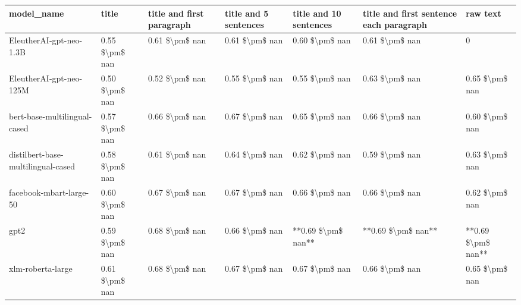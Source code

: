 \begin{tabular}{lllllll}
\toprule
                        model\_name &          title & title and first paragraph & title and 5 sentences & title and 10 sentences & title and first sentence each paragraph &           raw text \\
\midrule
           EleutherAI-gpt-neo-1.3B & 0.55 \$\textbackslash pm\$ nan &            0.61 \$\textbackslash pm\$ nan &        0.61 \$\textbackslash pm\$ nan &         0.60 \$\textbackslash pm\$ nan &                          0.61 \$\textbackslash pm\$ nan &                  0 \\
           EleutherAI-gpt-neo-125M & 0.50 \$\textbackslash pm\$ nan &            0.52 \$\textbackslash pm\$ nan &        0.55 \$\textbackslash pm\$ nan &         0.55 \$\textbackslash pm\$ nan &                          0.63 \$\textbackslash pm\$ nan &     0.65 \$\textbackslash pm\$ nan \\
      bert-base-multilingual-cased & 0.57 \$\textbackslash pm\$ nan &            0.66 \$\textbackslash pm\$ nan &        0.67 \$\textbackslash pm\$ nan &         0.65 \$\textbackslash pm\$ nan &                          0.66 \$\textbackslash pm\$ nan &     0.60 \$\textbackslash pm\$ nan \\
distilbert-base-multilingual-cased & 0.58 \$\textbackslash pm\$ nan &            0.61 \$\textbackslash pm\$ nan &        0.64 \$\textbackslash pm\$ nan &         0.62 \$\textbackslash pm\$ nan &                          0.59 \$\textbackslash pm\$ nan &     0.63 \$\textbackslash pm\$ nan \\
           facebook-mbart-large-50 & 0.60 \$\textbackslash pm\$ nan &            0.67 \$\textbackslash pm\$ nan &        0.67 \$\textbackslash pm\$ nan &         0.66 \$\textbackslash pm\$ nan &                          0.66 \$\textbackslash pm\$ nan &     0.62 \$\textbackslash pm\$ nan \\
                              gpt2 & 0.59 \$\textbackslash pm\$ nan &            0.68 \$\textbackslash pm\$ nan &        0.66 \$\textbackslash pm\$ nan &     **0.69 \$\textbackslash pm\$ nan** &                      **0.69 \$\textbackslash pm\$ nan** & **0.69 \$\textbackslash pm\$ nan** \\
                 xlm-roberta-large & 0.61 \$\textbackslash pm\$ nan &            0.68 \$\textbackslash pm\$ nan &        0.67 \$\textbackslash pm\$ nan &         0.67 \$\textbackslash pm\$ nan &                          0.66 \$\textbackslash pm\$ nan &     0.65 \$\textbackslash pm\$ nan \\
\bottomrule
\end{tabular}
